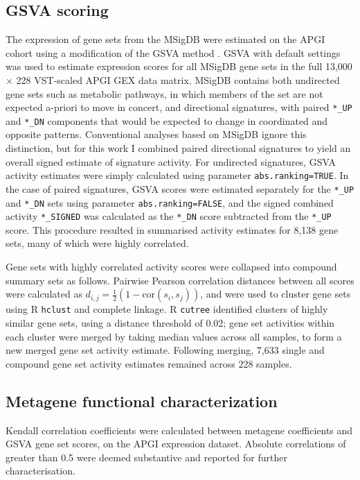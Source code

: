 \documentclass[dissertation.tex]{subfiles}
\begin{document}
\subsection{\acrshort{GSVA} scoring}
The expression of gene sets from the \gls{MSigDB} \cite{Subramanian2005} were estimated on the \gls{APGI} cohort using a modification of the \gls{GSVA} method \cite{Hanzelmann2013}.  \gls{GSVA} with default settings was used to estimate expression scores for all \gls{MSigDB} gene sets in the full 13,000 $\times$ 228 \gls{VST}-scaled \gls{APGI} \gls{GEX} data matrix.  \gls{MSigDB} contains both undirected gene sets such as metabolic pathways, in which members of the set are not expected a-priori to move in concert, and directional signatures, with paired \texttt{*\_UP} and \texttt{*\_DN} components that would be expected to change in coordinated and opposite patterns.  Conventional analyses based on \gls{MSigDB} ignore this distinction, but for this work I combined paired directional signatures to yield an overall signed estimate of signature activity.  For undirected signatures, \gls{GSVA} activity estimates were simply calculated using parameter \texttt{abs.ranking=TRUE}.  In the case of paired signatures, \gls{GSVA} scores were estimated separately for the \texttt{*\_UP} and \texttt{*\_DN} sets using parameter \texttt{abs.ranking=FALSE}, and the signed combined activity \texttt{*\_SIGNED} was calculated as the \texttt{*\_DN} score subtracted from the \texttt{*\_UP} score.  This procedure resulted in summarised activity estimates for 8,138 gene sets, many of which were highly correlated.

Gene sets with highly correlated activity scores were collapsed into compound summary sets as follows.  Pairwise Pearson correlation distances between all scores were calculated as $d_{i,j} = \frac{1}{2}(1 - \text{cor}(s_i, s_j))$, and were used to cluster gene sets using R \texttt{hclust} and complete linkage.  R \texttt{cutree} identified clusters of highly similar gene sets, using a distance threshold of 0.02; gene set activities within each cluster were merged by taking median values across all samples, to form a new merged gene set activity estimate.  Following merging, 7,633 single and compound gene set activity estimates remained across 228 samples.

\subsection{Metagene functional characterization}
Kendall correlation coefficients were calculated between metagene coefficients and \gls{GSVA} gene set scores, on the \gls{APGI} expression dataset.  Absolute correlations of greater than 0.5 were deemed substantive and reported for further characterisation.
\end{document}
